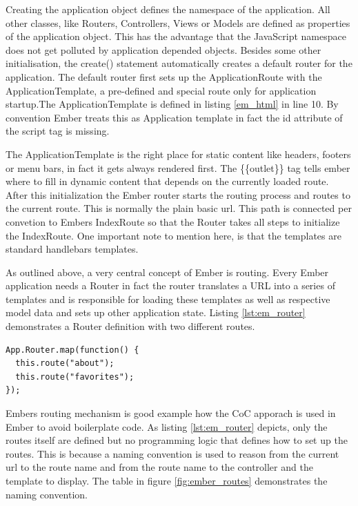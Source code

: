 Creating the application object defines the namespace of the application.
All other classes, like Routers, Controllers, Views or Models are defined as properties of the application object.
This has the advantage that the JavaScript namespace does not get polluted by application depended objects.
Besides some other initialisation, the create() statement automatically creates a default router for the application.
The default router first sets up the ApplicationRoute with the ApplicationTemplate, a pre-defined and special route only for application startup.The ApplicationTemplate is defined in listing \ref{em_html} in line 10.
By convention Ember treats this as Application template in fact the id attribute of the script tag is missing.

The ApplicationTemplate is the right place for static content like headers, footers or menu bars, in fact it gets always rendered first.
The \{\{outlet\}\} tag tells ember where to fill in dynamic content that depends on the currently loaded route.
After this initialization the Ember router starts the routing process and routes to the current route.
This is normally the plain basic url.
This path is connected per convetion to Embers IndexRoute so that the Router takes all steps to initialize the IndexRoute.
One important note to mention here, is that the templates are standard handlebars templates.

As outlined above, a very central concept of Ember is routing.
Every Ember application needs a Router in fact the router translates a URL into a series of templates and is responsible for loading these templates as well as respective model data and sets up other application state.
Listing \ref{lst:em_router} demonstrates a Router definition with two different routes.

\begin{lstlisting}[label=lst:em_router,caption=Router Defintion in Ember]
App.Router.map(function() {
  this.route("about");
  this.route("favorites");
});
\end{lstlisting}

Embers routing mechanism is good example how the CoC apporach is used in Ember to avoid boilerplate code. As listing \ref{lst:em_router} depicts, only the routes itself are defined but no programming logic that defines how to set up the routes. 
This is because a naming convention is used to reason from the current url to the route name and from the route name to the controller and the template to display.
The table in figure \ref{fig:ember_routes} demonstrates the naming convention.

